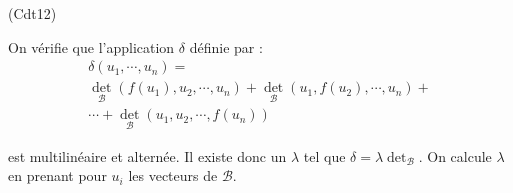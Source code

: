 \begin{tiny}(Cdt12)\end{tiny} On vérifie que l'application $\delta$ définie par :
\begin{multline*}
\delta(u_1,\cdots,u_n)= \\
 \det_\mathcal B(f(u_1),u_2,\cdots,u_n)
+ \det_\mathcal B(u_1,f(u_2),\cdots,u_n) + \\ \cdots + 
\det_\mathcal B(u_1,u_2,\cdots,f(u_n))
\end{multline*}

est multilinéaire et alternée. Il existe donc un $\lambda$ tel que $\delta = \lambda \det_\mathcal B$. On calcule $\lambda$ en prenant pour $u_i$ les vecteurs de $\mathcal B$.
